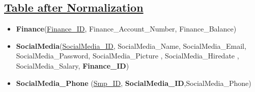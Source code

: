 \subsection*{\underline{Table after Normalization}}
\begin{itemize}
    \item \textbf{Finance}(\underline{Finance\_ID}, Finance\_Account\_Number, Finance\_Balance)
    \item \textbf{SocialMedia}(\underline{SocialMedia\_ID}, SocialMedia\_Name, SocialMedia\_Email, SocialMedia\_Password, SocialMedia\_Picture ,  SocialMedia\_Hiredate , SocialMedia\_Salary, \textbf{Finance\_ID})
    \item \textbf{SocialMedia\_Phone} (\underline{Smp\_ID}, \textbf{SocialMedia\_ID},{SocialMedia\_Phone})
\end{itemize}
\clearpage